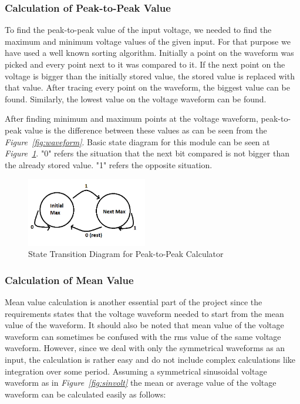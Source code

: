 \documentclass[paper]{IEEEtran}
\begin{document}
\subsubsection{Calculation of Peak-to-Peak Value }	
\- \indent
	
	To find the peak-to-peak value of the input voltage, we needed to find the maximum and minimum voltage values of the given input. For that purpose we have used a well known sorting algorithm. Initially a point on the waveform was picked and every point next to it was compared to it. If the next point on the voltage is bigger than the initially stored value, the stored value is replaced with that value. After tracing every point on the waveform, the biggest value can be found. Similarly, the lowest value on the voltage waveform can be found. 
	
	After finding minimum and maximum points at the voltage waveform, peak-to-peak value is the difference between these values as can be seen from the \textit{Figure~\ref{fig:waveform}}. Basic state diagram for this module can be seen at \textit{Figure~\ref{fig:peakstate}}. "0" refers the situation that the next bit compared is not bigger than the already stored value. "1"	 refers the opposite situation.
	
	\begin{figure}[h!]
	\setlength{\unitlength}{\textwidth}
	\center 
	\includegraphics[width=0.47\textwidth]{peakstate}
	\caption{\label{fig:peakstate} State Transition Diagram for Peak-to-Peak Calculator}
\end{figure}


	
\subsubsection{Calculation of Mean Value}
\- \indent

	Mean value calculation is another essential part of the project since the requirements states that the voltage waveform needed to start from the mean value of the waveform. It should also be noted that mean value of the voltage waveform can sometimes be confused with the rms value of the same voltage waveform. However, since we deal with only the symmetrical waveforms as an input, the calculation is rather easy and do not include complex calculations like integration over some period. Assuming a symmetrical sinusoidal voltage waveform as in \textit{Figure~\ref{fig:sinvolt}} the mean or average value of the voltage waveform can be calculated easily as follows:
	
\end{document}
